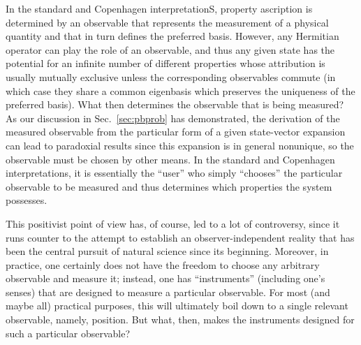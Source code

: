 \documentclass[twocolumn,rmp,aps,amsmath,amsfonts,noshowkeys,noshowpacs]{revtex4}
\begin{document}
In the standard and Copenhagen interpretationS, property ascription is
determined by an observable that represents the measurement of a
physical quantity and that in turn defines the preferred basis.
However, any Hermitian operator can play the role of an observable,
and thus any given state has the potential for an infinite number of
different properties whose attribution is usually mutually exclusive
unless the corresponding observables commute (in which case they share
a common eigenbasis which preserves the uniqueness of the preferred
basis). What then determines the observable that is being measured? As
our discussion in Sec.~\ref{sec:pbprob} has demonstrated, the
derivation of the measured observable from the particular form of a
given state-vector expansion can lead to paradoxial results since this
expansion is in general nonunique, so the observable must be chosen by
other means. In the standard and Copenhagen interpretations, it is
essentially the ``user'' who simply ``chooses'' the particular
observable to be measured and thus determines which properties the
system possesses.

This positivist point of view has, of course, led to a lot of
controversy, since it runs counter to the attempt to establish an
observer-independent reality that has been the central pursuit of
natural science since its beginning.  Moreover, in practice, one
certainly does not have the freedom to choose any arbitrary observable
and measure it; instead, one has ``instruments'' (including one's
senses) that are designed to measure a particular observable. For most
(and maybe all) practical purposes, this will ultimately boil down to
a single relevant observable, namely, position. But what, then, makes
the instruments designed for such a particular observable?
\end{document}
